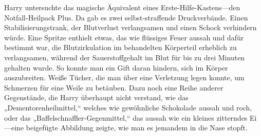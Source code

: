 Harry untersuchte das magische Äquivalent eines Erste-Hilfe-Kastens—den Notfall-Heilpack Plus. Da gab es zwei selbst-straffende Druckverbände. Einen Stabilisierungstrank, der Blutverlust verlangsamen und einen Schock verhindern würde. Eine Spritze enthielt etwas, das wie flüssiges Feuer aussah und dafür bestimmt war, die Blutzirkulation im behandelten Körperteil erheblich zu verlangsamen, während der Sauerstoffgehalt im Blut für bis zu drei Minuten gehalten wurde. So konnte man ein Gift daran hindern, sich im Körper auszubreiten. Weiße Tücher, die man über eine Verletzung legen konnte, um Schmerzen für eine Weile zu betäuben. Dazu noch eine Reihe anderer Gegenstände, die Harry überhaupt nicht verstand, wie das „Dementorenheilmittel,“ welches wie gewöhnliche Schokolade aussah und roch, oder das „Baffelschnaffler-Gegenmittel,“ das aussah wie ein kleines zitterndes Ei—eine beigefügte Abbildung zeigte, wie man es jemandem in die Nase stopft.

